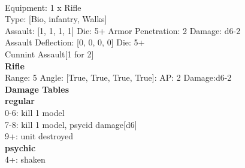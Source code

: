  \\
Equipment: 1 x Rifle \\
Type: [Bio, infantry, Walks] \\

Assault: [1, 1, 1, 1] Die: 5+ Armor Penetration: 2 Damage: d6-2 \\
Assault Deflection: [0, 0, 0, 0] Die: 5+\\
\indent Cunnint Assault[1 for 2]\\ 
 



{\bf Rifle } \\



Range: 5  Angle: [True, True, True, True]: AP: 2 Damage:d6-2 \\




 





{\bf Damage Tables} \\
 {\bf regular } \\
0-6: kill 1 model \\
7-8: kill 1 model, psycid damage[d6] \\
9+: unit destroyed \\
 {\bf psychic } \\
4+: shaken \\










\pagebreak